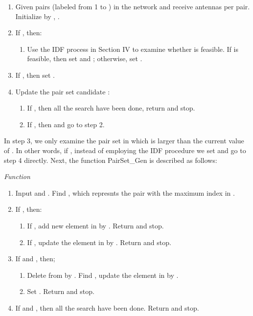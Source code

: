 \documentclass[draftcls,onecolumn,peerview,12pt]{IEEEtran}
\begin{document}
\begin{enumerate}
\item Given  pairs (labeled from 1 to ) in the network and  receive antennas per pair. Initialize by , .
\item If , then:
    \begin{enumerate}
    \item Use the IDF process in Section IV to examine whether  is feasible. If  is feasible, then set  and ; otherwise, set .
    \end{enumerate}
\item If , then set .
\item Update the pair set candidate :
    \begin{enumerate}
    \item If , then all the search have been done, return  and stop.
    \item If , then  and go to
step 2.
    \end{enumerate}
\end{enumerate}

In step 3, we only examine the pair set  in which
 is larger than the current value of
. In other words, if , instead of employing the IDF
procedure we set  and go to step 4 directly. Next,
the function PairSet{\_}Gen is described as follows:

\textit{Function } 
\begin{enumerate}
\item Input  and . Find , which represnts the pair with the maximum index in .
\item If , then:
    \begin{enumerate}
    \item If , add new element in  by
    . Return
     and stop.

    \item If , update the element  in  by .
    Return  and stop.
    \end{enumerate}
\item If  and , then;
    \begin{enumerate}
    \item Delete  from  by . Find , update the element
 in  by
.

    \item Set . Return  and
stop.
    \end{enumerate}

\item If  and , then
all the search have been done. Return  and stop.
\end{enumerate}
\end{document}
